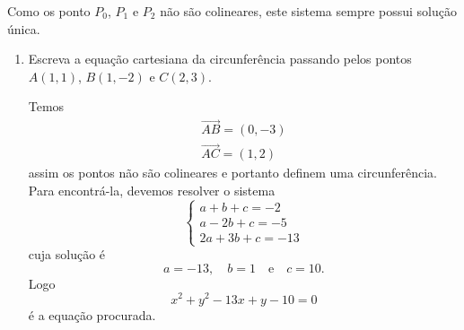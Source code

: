 Como os ponto $P_0$, $P_1$ e $P_2$ n\~ao s\~ao colineares, este sistema sempre possui solu\c{c}\~ao \'unica.

\begin{exemplos}
  \begin{enumerate}
    \item Escreva a equa\c{c}\~ao cartesiana da circunfer\^encia passando pelos pontos $A(1,1)$, $B(1,-2)$ e $C(2,3)$.
    \begin{solucao}
      Temos
      \begin{align*}
        \vec{AB} = (0,-3)\\
        \vec{AC} = (1,2)
      \end{align*}
      assim os pontos n\~ao s\~ao colineares e portanto definem uma circunfer\^encia. Para encontr\'a-la, devemos resolver o sistema
      \[
        \begin{cases}
          a + b + c = -2\\
          a - 2b + c = -5\\
          2a + 3b + c = -13
        \end{cases}
      \]
      cuja solu\c{c}\~ao \'e
      \[
        a = -13,\quad b = 1 \quad\mbox{e}\quad c = 10.
      \]
      Logo
      \[
        x^2 + y^2 - 13x + y - 10 = 0
      \]
      \'e a equa\c{c}\~ao procurada.


\end{solucao}
\end{enumerate}
\end{exemplos}
